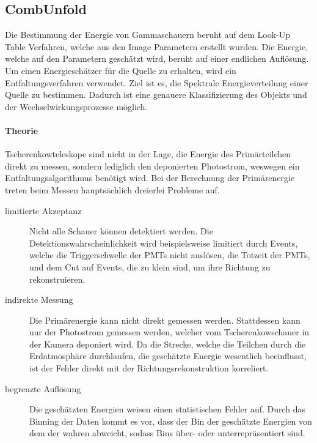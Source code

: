 \subsection{CombUnfold}%
\label{sub:combunfold}
Die Bestimmung der Energie von Gammaschauern beruht auf dem Look-Up Table
Verfahren,
welche aus den Image Parametern erstellt wurden.
Die Energie, welche auf den Parametern geschätzt wird, beruht auf einer
endlichen Auflösung.
Um einen Energieschätzer für die Quelle zu erhalten,
wird ein Entfaltungsverfahren verwendet.
Ziel ist es, die Spektrale Energieverteilung einer Quelle zu bestimmen.
Dadurch ist eine genauere Klassifizierung des Objekts und der
Wechselwirkungsprozesse möglich.

\paragraph{Theorie}%
\label{par:theorie}

Tscherenkowteleskope sind nicht in der Lage, die Energie
des Primärteilchen direkt zu messen,
sondern lediglich den deponierten Photostrom,
weswegen ein Entfaltungsalgorithmus benötigt wird.
Bei der Berechnung der Primärenergie treten beim Messen hauptsächlich dreierlei Probleme auf.

\begin{description}
    \item[\quad limitierte Akzeptanz]
        Nicht alle Schauer können detektiert werden.
        Die Detektionswahrscheinlichkeit wird beispielsweise limitiert
        durch Events, welche die Triggerschwelle der PMTs nicht auslösen,
        die Totzeit der PMTs,
        und dem Cut auf Events, die zu klein sind, um ihre Richtung zu rekonstruieren.

    \item[\quad indirekte Messung]
        Die Primärenergie kann nicht direkt gemessen werden.
        Stattdessen kann nur der Photostrom gemessen werden,
        welcher vom Tscherenkowschauer in der Kamera deponiert wird.
        Da die Strecke, welche die Teilchen durch die Erdatmosphäre durchlaufen,
        die geschätzte Energie wesentlich beeinflusst,
        ist der Fehler direkt mit der Richtungsrekonstruktion korreliert.

    \item[\quad begrenzte Auflösung]
        Die geschätzten Energien weisen einen statistischen Fehler auf.
        Durch das Binning der Daten kommt es vor,
        dass der Bin der geschätzte Energien von dem der wahren abweicht,
        sodass Bins über- oder unterrepräsentiert sind.
\end{description}

